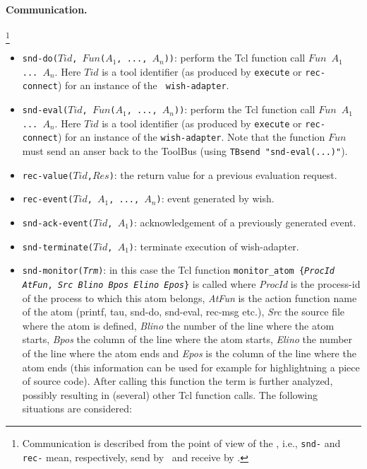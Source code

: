 \paragraph{Communication.} \hspace{-0.3cm}\footnote{Communication is described
from the point of view of the \TB, i.e., {\tt snd-} and {\tt rec-}
mean, respectively, send by \TB\ and receive by \TB.}

\begin{itemize}
\item {\tt snd-do($Tid$, $Fun$($A_1$, ..., $A_n$))}: perform the Tcl function
call
{\tt $Fun$ $A_1$  ... $A_n$}. Here $Tid$ is a tool identifier
(as produced by {\tt execute} or {\tt rec-connect}) for an instance of the {\tt
wish-adapter}.
\item {\tt snd-eval($Tid$, $Fun$($A_1$, ..., $A_n$))}: perform the Tcl function call
{\tt $Fun$ $A_1$  ... $A_n$}. Here $Tid$ is a tool identifier 
(as produced by {\tt execute} or {\tt rec-connect}) for an instance of the {\tt wish-adapter}.
Note that the function {\tt $Fun$} must send an anser back to the
ToolBus (using {\tt TBsend "snd-eval(...)"}).
\item {\tt rec-value($Tid$,$Res$)}: the return value for a previous evaluation request.
\item {\tt rec-event($Tid$, $A_1$, ..., $A_n$)}: event generated by wish.
\item {\tt snd-ack-event($Tid$, $A_1$)}: acknowledgement of
a previously generated event.
\item {\tt snd-terminate($Tid$, $A_1$)}: terminate execution of wish-adapter.
\item \texttt{snd-monitor(\emph{Trm})}: in this case the Tcl
  function \texttt{monitor\_atom \{\emph{ProcId} \emph{AtFun},
    \emph{Src} \emph{Blino} \emph{Bpos} \emph{Elino} \emph{Epos}\}}
  is called where \emph{ProcId} is the process-id of the process to
  which this atom belongs, \emph{AtFun} is the action function name of
  the atom (printf, tau, snd-do, snd-eval, rec-msg etc.), \emph{Src} the
  source file where the atom is defined, \emph{Blino} the number of
  the line where the atom starts, \emph{Bpos} the column of the
  line where the atom starts, \emph{Elino} the number of the line
  where the atom ends and \emph{Epos} is the column of the line where
  the atom ends (this information can be used for example for
  highlightning a piece of source code). 
  After calling this function the term is further analyzed,
  possibly resulting in (several) other Tcl function
  calls. The following situations are considered:

\end{itemize}
